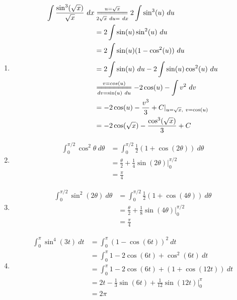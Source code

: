 \documentclass[a4]{article}
\begin{document}
\begin{enumerate}[label={\bf{}\arabic*}.]
\item%
	\begin{align*}
	\int\frac{\sin^3(\sqrt{x})}{\sqrt{x}}\ dx&\overset{u=\sqrt{x}}{\underset{2\sqrt{x}\ du=\ dx}{=\joinrel=\joinrel=\joinrel=\joinrel=\joinrel=\joinrel=}}2\int\sin^3(u)\ du\\
	&=2\int\sin(u)\sin^2(u)\ du\\
	&=2\int\sin(u)(1-\cos^2(u))\ du\\
	&=2\int\sin(u)\ du-2\int\sin(u)\cos^2(u)\ du\\
	&\overset{v=cos(u)}{\underset{dv=\sin(u)\ du}{=\joinrel=\joinrel=\joinrel=\joinrel=\joinrel=\joinrel=\joinrel=}}-2\cos(u)-\int v^2\ dv\\
	&=-2\cos(u)-\frac{v^3}{3}+C|_{u=\sqrt{x},\ v=\cos(u)}\\
	&=-2\cos(\sqrt{x})-\frac{\cos^3(\sqrt{x})}{3}+C
	\end{align*}

\color{red}\item[\refstepcounter{enumi}\fbox{\number\value{enumi}.}]\color{black}%
	\begin{align*}
	\int_0^{\pi/2}\cos^2\theta\ d\theta&=\int_0^{\pi/2}\frac{1}{2}(1+\cos(2\theta))\ d\theta\\
	&=\frac{\theta}{2}+\frac{1}{4}\sin(2\theta)|_0^{\pi/2}\\
	&=\frac{\pi}{4}
	\end{align*}

\item%
	\begin{align*}
	\int_0^{\pi/2}\sin^2(2\theta)\ d\theta&=\int_0^{\pi/2}\frac{1}{2}(1+\cos(4\theta))\ d\theta\\
	&=\frac{\theta}{2}+\frac{1}{8}\sin(4\theta)\Big|_0^{\pi/2}\\
	&=\frac{\pi}{4}
	\end{align*}

\item%
	\begin{align*}
	\int_0^\pi\sin^4(3t)\ dt&=\int_0^\pi(1-\cos(6t))^2\ dt\\
	&=\int_0^\pi1-2\cos(6t)+\cos^2(6t)\ dt\\
	&=\int_0^\pi1-2\cos(6t)+(1+\cos(12t))\ dt\\
	&=2t-\frac{1}{3}\sin(6t)+\frac{1}{12}\sin(12t)\Big|_0^\pi\\
	&=2\pi
	\end{align*}



\end{enumerate}
\end{document}
